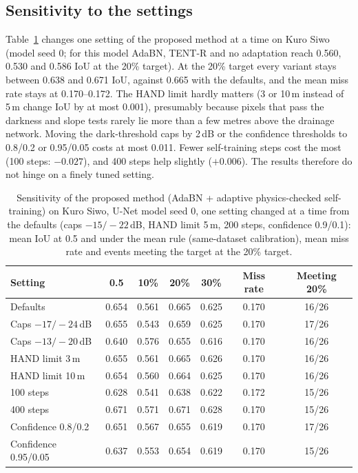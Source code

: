 \documentclass[a4paper,fleqn]{cas-sc}
\begin{document}
\subsection{Sensitivity to the settings}
Table~\ref{tab:sens} changes one setting of the proposed method at a time on Kuro Siwo (model seed 0; for this model AdaBN, TENT-R and no adaptation reach 0.560, 0.530 and 0.586 IoU at the 20\% target). At the 20\% target every variant stays between 0.638 and 0.671 IoU, against 0.665 with the defaults, and the mean miss rate stays at 0.170--0.172. The HAND limit hardly matters (3 or 10\,m instead of 5\,m change IoU by at most 0.001), presumably because pixels that pass the darkness and slope tests rarely lie more than a few metres above the drainage network. Moving the dark-threshold caps by 2\,dB or the confidence thresholds to 0.8/0.2 or 0.95/0.05 costs at most 0.011. Fewer self-training steps cost the most (100 steps: $-0.027$), and 400 steps help slightly ($+0.006$). The results therefore do not hinge on a finely tuned setting.

\begin{table}[t]
\caption{Sensitivity of the proposed method (AdaBN + adaptive physics-checked self-training) on Kuro Siwo, U-Net model seed 0, one setting changed at a time from the defaults (caps $-15/-22$\,dB, HAND limit 5\,m, 200 steps, confidence 0.9/0.1): mean IoU at 0.5 and under the mean rule (same-dataset calibration), mean miss rate and events meeting the target at the 20\% target.}
\label{tab:sens}
\centering
\begin{tabular}{lcccccc}
\toprule
Setting & 0.5 & 10\% & 20\% & 30\% & Miss rate & Meeting 20\% \\
\midrule
Defaults & 0.654 & 0.561 & 0.665 & 0.625 & 0.170 & 16/26 \\
Caps $-17/-24$\,dB & 0.655 & 0.543 & 0.659 & 0.625 & 0.170 & 17/26 \\
Caps $-13/-20$\,dB & 0.640 & 0.576 & 0.655 & 0.616 & 0.170 & 16/26 \\
HAND limit 3\,m & 0.655 & 0.561 & 0.665 & 0.626 & 0.170 & 16/26 \\
HAND limit 10\,m & 0.654 & 0.560 & 0.664 & 0.625 & 0.170 & 16/26 \\
100 steps & 0.628 & 0.541 & 0.638 & 0.622 & 0.172 & 15/26 \\
400 steps & 0.671 & 0.571 & 0.671 & 0.628 & 0.170 & 15/26 \\
Confidence 0.8/0.2 & 0.651 & 0.567 & 0.655 & 0.619 & 0.170 & 17/26 \\
Confidence 0.95/0.05 & 0.637 & 0.553 & 0.654 & 0.619 & 0.170 & 15/26 \\
\bottomrule
\end{tabular}
\end{table}
\end{document}
